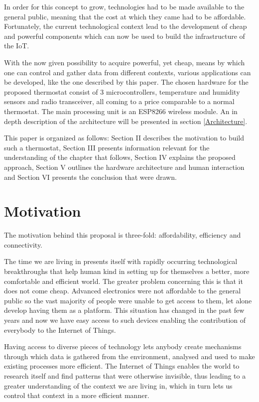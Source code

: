 \documentclass[conference]{IEEEtran}
\let\Oldsection\section
\renewcommand{\section}{\FloatBarrier\Oldsection}
\begin{document}
In order for this concept to grow, technologies had to be made available to the general public, meaning that
the cost at which they came had to be affordable. Fortunately, the current technological context lead to
the development of cheap and powerful components which can now be used to build the infrastructure of the IoT.

With the now given possibility to acquire powerful, yet cheap, means by which one can control and gather data
from different contexts, various applications can be developed, like the one described by this paper.
The chosen hardware for the proposed thermostat consist of 3 microcontrollers, temperature and humidity sensors
and radio transceiver, all coming to a price comparable to a normal thermostat. The main processing unit
is an ESP8266 wireless module. An in depth description of the architecture will be presented in
section \ref{Architecture}.

This paper is organized as follows: Section II describes the motivation to build such a thermostat, Section III
presents information relevant for the understanding of the chapter that follows, Section IV explains the proposed
approach, Section V outlines the hardware architecture and human interaction and Section VI presents the conclusion
that were drawn.

\section{Motivation}
\label{Motivation}

The motivation behind this proposal is three-fold: affordability, efficiency and connectivity.

The time we are living in presents itself with rapidly occurring technological breakthroughs that help human
kind in setting up for themselves a better, more comfortable and efficient world. The greater problem concerning
this is that it does not come cheap. Advanced electronics were not affordable to the general public so the vast
majority of people were unable to get access to them, let alone develop  having them as a platform. This
situation has changed in the past few years and now we have easy access to such devices enabling the
contribution of everybody to the Internet of Things.

Having access to diverse pieces of technology lets anybody create mechanisms through which data is gathered
from the environment, analysed and used to make existing processes more efficient. The Internet of Things
enables the world to research itself and find patterns that were otherwise invisible, thus leading to a greater
understanding of the context we are living in, which in turn lets us control that context in a more efficient
manner.
\end{document}
